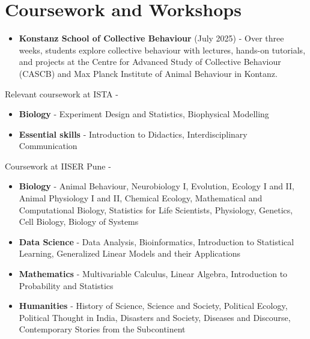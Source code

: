 
\section{Coursework and Workshops}

\begin{itemize}
    \item \textbf{Konstanz School of Collective Behaviour} {(July 2025) - Over three weeks, students explore collective behaviour with lectures, hands-on tutorials, and projects at the Centre for Advanced Study of Collective Behaviour (CASCB) and Max Planck Institute of Animal Behaviour in Kontanz.}
\end{itemize}

Relevant coursework at ISTA - 
\begin{itemize}
    \item \textbf{Biology} {- Experiment Design and Statistics, Biophysical Modelling}
    \item \textbf{Essential skills} {- Introduction to Didactics, Interdisciplinary Communication}
\end{itemize}

Coursework at IISER Pune -
\begin{itemize}
    \item \textbf{Biology} {- Animal Behaviour, Neurobiology I, Evolution, Ecology I and II, Animal Physiology I and II, Chemical Ecology, Mathematical and Computational Biology, Statistics for Life Scientists, Physiology, Genetics, Cell Biology, Biology of Systems}
    \item \textbf{Data Science} {- Data Analysis, Bioinformatics, Introduction to Statistical Learning, Generalized Linear Models and their Applications}
    \item \textbf{Mathematics} {- Multivariable Calculus, Linear Algebra, Introduction to Probability and Statistics}
    \item \textbf{Humanities} {- History of Science, Science and Society, Political Ecology, Political Thought in India, Disasters and Society, Diseases and Discourse, Contemporary Stories from the Subcontinent}
\end{itemize}

